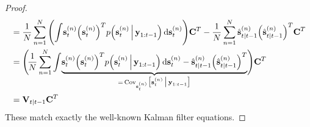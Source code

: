 \begin{proof}
\begin{align*}
					&= \frac{1}{N} \sum_{n = 1}^{N} \Bigg(\! \int\! \boldsymbol{\mathrm{s}}_t^{(n)} \Big(\boldsymbol{\mathrm{s}}_t^{(n)}\Big)^T p\Big(\boldsymbol{\mathrm{s}}_t^{(n)} \,\Big\vert\, \boldsymbol{\mathrm{y}}_{1:t - 1}\Big) \dd{\boldsymbol{\mathrm{s}}_t^{(n)}} \!\Bigg) \boldsymbol{\mathrm{C}}^T - \frac{1}{N} \sum_{n = 1}^{N} \hat{\boldsymbol{\mathrm{s}}}_{t \vert t - 1}^{(n)} \Big(\hat{\boldsymbol{\mathrm{s}}}_{t \vert t - 1}^{(n)}\Big)^T \boldsymbol{\mathrm{C}}^T \\
					&= \Bigg(\! \frac{1}{N} \sum_{n = 1}^{N} \int\! \underbrace{\boldsymbol{\mathrm{s}}_t^{(n)} \Big(\boldsymbol{\mathrm{s}}_t^{(n)}\Big)^T p\Big(\boldsymbol{\mathrm{s}}_t^{(n)} \,\Big\vert\, \boldsymbol{\mathrm{y}}_{1:t - 1}\Big) \dd{\boldsymbol{\mathrm{s}}_t^{(n)}} - \hat{\boldsymbol{\mathrm{s}}}_{t \vert t - 1}^{(n)} \Big(\hat{\boldsymbol{\mathrm{s}}}_{t \vert t - 1}^{(n)}\Big)^T}_{=\, \operatorname{Cov}_{\boldsymbol{\mathrm{s}}_t^{(n)}}\!\big[\boldsymbol{\mathrm{s}}_t^{(n)} \,\big\vert\, \boldsymbol{\mathrm{y}}_{1:t - 1}\big]} \!\Bigg) \boldsymbol{\mathrm{C}}^T \\
					&= \boldsymbol{\mathrm{V}}_{t \vert t - 1} \boldsymbol{\mathrm{C}}^T
			\end{align*}
			These match exactly the well-known Kalman filter equations.


\end{proof}
